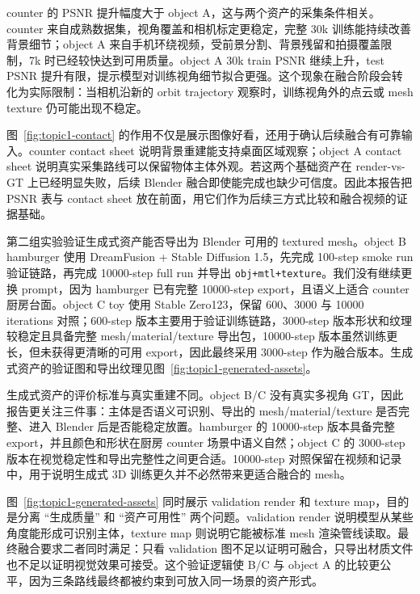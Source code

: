 \documentclass{article}
\begin{document}
	counter 的 PSNR 提升幅度大于 object A，这与两个资产的采集条件相关。counter 来自成熟数据集，视角覆盖和相机标定更稳定，完整 30k 训练能持续改善背景细节；object A 来自手机环绕视频，受前景分割、背景残留和拍摄覆盖限制，7k 时已经较快达到可用质量。object A 30k train PSNR 继续上升，test PSNR 提升有限，提示模型对训练视角细节拟合更强。这个现象在融合阶段会转化为实际限制：当相机沿新的 orbit trajectory 观察时，训练视角外的点云或 mesh texture 仍可能出现不稳定。

	图~\ref{fig:topic1-contact} 的作用不仅是展示图像好看，还用于确认后续融合有可靠输入。counter contact sheet 说明背景重建能支持桌面区域观察；object A contact sheet 说明真实采集路线可以保留物体主体外观。若这两个基础资产在 render-vs-GT 上已经明显失败，后续 Blender 融合即使能完成也缺少可信度。因此本报告把 PSNR 表与 contact sheet 放在前面，用它们作为后续三方式比较和融合视频的证据基础。

	第二组实验验证生成式资产能否导出为 Blender 可用的 textured mesh。object B hamburger 使用 DreamFusion + Stable Diffusion 1.5，先完成 100-step smoke run 验证链路，再完成 10000-step full run 并导出 \texttt{obj+mtl+texture}。我们没有继续更换 prompt，因为 hamburger 已有完整 10000-step export，且语义上适合 counter 厨房台面。object C toy 使用 Stable Zero123，保留 600、3000 与 10000 iterations 对照；600-step 版本主要用于验证训练链路，3000-step 版本形状和纹理较稳定且具备完整 mesh/material/texture 导出包，10000-step 版本虽然训练更长，但未获得更清晰的可用 export，因此最终采用 3000-step 作为融合版本。生成式资产的验证图和导出纹理见图~\ref{fig:topic1-generated-assets}。

	生成式资产的评价标准与真实重建不同。object B/C 没有真实多视角 GT，因此报告更关注三件事：主体是否语义可识别、导出的 mesh/material/texture 是否完整、进入 Blender 后是否能稳定放置。hamburger 的 10000-step 版本具备完整 export，并且颜色和形状在厨房 counter 场景中语义自然；object C 的 3000-step 版本在视觉稳定性和导出完整性之间更合适。10000-step 对照保留在视频和记录中，用于说明生成式 3D 训练更久并不必然带来更适合融合的 mesh。

	图~\ref{fig:topic1-generated-assets} 同时展示 validation render 和 texture map，目的是分离 ``生成质量'' 和 ``资产可用性'' 两个问题。validation render 说明模型从某些角度能形成可识别主体，texture map 则说明它能被标准 mesh 渲染管线读取。最终融合要求二者同时满足：只看 validation 图不足以证明可融合，只导出材质文件也不足以证明视觉效果可接受。这个验证逻辑使 B/C 与 object A 的比较更公平，因为三条路线最终都被约束到可放入同一场景的资产形式。
\end{document}
